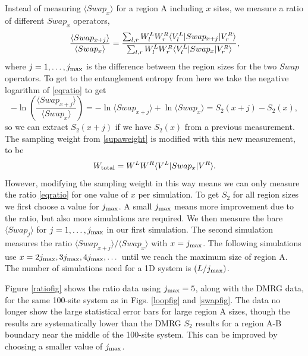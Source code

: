 Instead of measuring  $\langle Swap_x \rangle$ for a region A including $x$ sites, we measure a ratio of different $Swap_x$ operators,
\begin{equation}
\label{eqratio}
\frac{\langle Swap_{x+j}\rangle}{\langle Swap_{x}\rangle} = 
\frac{ \sum_{l,r} W^L_l W^R_r \langle {V^L_l} \rvert Swap_{x+j} \lvert {V^R_r} \rangle}
							{\sum_{l,r} W^L_l W_r^R \langle {V^L_l} \rvert Swap_x \lvert { V^R_r} \rangle},
\end{equation}
where $j=1,\dots,j_{\rm max}$ is the difference between the region sizes for the two $Swap$ operators.
To get to the entanglement entropy from here we take the negative logarithm of \eqref{eqratio} to get
\begin{equation}
\label{eqratio2}
-\ln\left( \frac{\langle Swap_{x+j}\rangle}{\langle Swap_{x}\rangle} \right) = 
-\ln \langle Swap_{x+j}\rangle + \ln\langle Swap_{x}\rangle   =   S_2(x+j) - S_2(x),
\end{equation}
so we can extract $S_2(x+j)$ if we have $S_2(x)$ from a previous measurement.
The sampling weight from \eqref{supaweight} is modified with this new measurement, to be
\begin{equation}
W_{\rm total} = W^LW^R\langle {V^L} \rvert Swap_x \lvert {V^R} \rangle.
\end{equation}
However, modifying the sampling weight in this way means we can only measure the ratio \eqref{eqratio} for one value of $x$ per simulation.
To get $S_2$ for all region sizes we first choose a value for $j_{\rm max}$.
A small $j_{\rm max}$ means more improvement due to the ratio, but also more simulations are required.
We then measure the bare $\langle Swap_{j}\rangle$ for $j=1,\dots,j_{\rm max}$ in our first simulation.
The second simulation measures the ratio $\langle Swap_{x+j}\rangle / \langle Swap_{x}\rangle$ with $x=j_{\rm max}$.  The following simulations use $x=2j_{\rm max}, 3j_{\rm max}, 4j_{\rm max}, \dots$ until we reach the maximum size of region A.
The number of simulations need for a 1D system is $(L/j_{\rm max})$.

Figure \ref{ratiofig} shows the ratio data using $j_{\rm max} = 5$, along with the DMRG data, for the same 100-site system as in Figs. \ref{loopfig} and \ref{swapfig}. 
The data no longer show the large statistical error bars for large region A sizes, though the results are systematically lower than the DMRG $S_2$ results for a region A-B boundary near the middle of the 100-site system.  
This can be improved by choosing a smaller value of $j_{\rm max}$.



